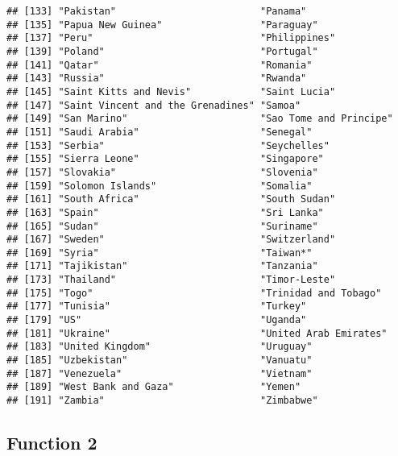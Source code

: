 \documentclass[]{tufte-handout}
\begin{document}
\begin{verbatim}
## [133] "Pakistan"                         "Panama"                          
## [135] "Papua New Guinea"                 "Paraguay"                        
## [137] "Peru"                             "Philippines"                     
## [139] "Poland"                           "Portugal"                        
## [141] "Qatar"                            "Romania"                         
## [143] "Russia"                           "Rwanda"                          
## [145] "Saint Kitts and Nevis"            "Saint Lucia"                     
## [147] "Saint Vincent and the Grenadines" "Samoa"                           
## [149] "San Marino"                       "Sao Tome and Principe"           
## [151] "Saudi Arabia"                     "Senegal"                         
## [153] "Serbia"                           "Seychelles"                      
## [155] "Sierra Leone"                     "Singapore"                       
## [157] "Slovakia"                         "Slovenia"                        
## [159] "Solomon Islands"                  "Somalia"                         
## [161] "South Africa"                     "South Sudan"                     
## [163] "Spain"                            "Sri Lanka"                       
## [165] "Sudan"                            "Suriname"                        
## [167] "Sweden"                           "Switzerland"                     
## [169] "Syria"                            "Taiwan*"                         
## [171] "Tajikistan"                       "Tanzania"                        
## [173] "Thailand"                         "Timor-Leste"                     
## [175] "Togo"                             "Trinidad and Tobago"             
## [177] "Tunisia"                          "Turkey"                          
## [179] "US"                               "Uganda"                          
## [181] "Ukraine"                          "United Arab Emirates"            
## [183] "United Kingdom"                   "Uruguay"                         
## [185] "Uzbekistan"                       "Vanuatu"                         
## [187] "Venezuela"                        "Vietnam"                         
## [189] "West Bank and Gaza"               "Yemen"                           
## [191] "Zambia"                           "Zimbabwe"
\end{verbatim}

\hypertarget{function-2}{%
\subsection{Function 2}\label{function-2}}
\end{document}
